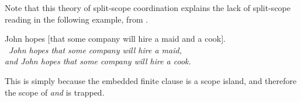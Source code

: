 \documentclass[nols,twoside,nofonts,nobib,nohyper]{tufte-handout}
\begin{document}
Note that this theory of split-scope coordination explains the lack of
split-scope reading in the following example, from \citet{parteeRooth}.

\ex
John hopes [that some company will hire a maid and a cook].\\
\xmark \textit{John hopes that some company will hire a maid,\\
and John hopes that
some company will hire a cook.}
\xe

This is simply because the embedded finite clause is a scope island, and
therefore the scope of \textit{and} is trapped.












\printbibliography
\end{document}
